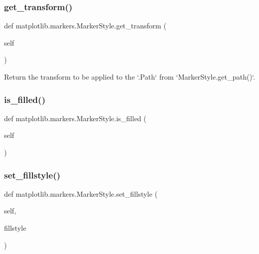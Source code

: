 \subsubsection{\texorpdfstring{get\+\_\+transform()}{get\_transform()}}
{\footnotesize\ttfamily def matplotlib.\+markers.\+Marker\+Style.\+get\+\_\+transform (\begin{DoxyParamCaption}\item[{}]{self }\end{DoxyParamCaption})}

\begin{DoxyVerb}Return the transform to be applied to the `.Path` from
`MarkerStyle.get_path()`.
\end{DoxyVerb}
 \mbox{\label{classmatplotlib_1_1markers_1_1MarkerStyle_acb57afd41d865aefef0faa28446cc743}} 
\subsubsection{\texorpdfstring{is\+\_\+filled()}{is\_filled()}}
{\footnotesize\ttfamily def matplotlib.\+markers.\+Marker\+Style.\+is\+\_\+filled (\begin{DoxyParamCaption}\item[{}]{self }\end{DoxyParamCaption})}

\mbox{\label{classmatplotlib_1_1markers_1_1MarkerStyle_a8b0b7f24d1d3736cba71a4d20018411f}} 
\subsubsection{\texorpdfstring{set\+\_\+fillstyle()}{set\_fillstyle()}}
{\footnotesize\ttfamily def matplotlib.\+markers.\+Marker\+Style.\+set\+\_\+fillstyle (\begin{DoxyParamCaption}\item[{}]{self,  }\item[{}]{fillstyle }\end{DoxyParamCaption})}

